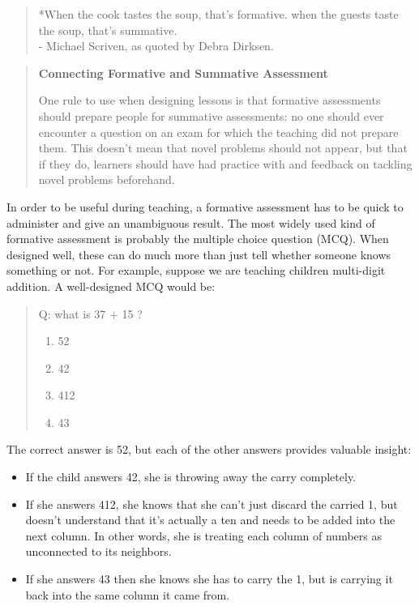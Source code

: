 \documentclass[10pt,statementpaper]{memoir}
\providecommand{\tightlist}{%
  \setlength{\itemsep}{0pt}\setlength{\parskip}{0pt}}
\begin{document}
\begin{quote}
*When the cook tastes the soup, that's formative. when the guests taste
the soup, that's summative.\\
- Michael Scriven, as quoted by Debra Dirksen.
\end{quote}

\begin{quote}
\textbf{Connecting Formative and Summative Assessment}

One rule to use when designing lessons is that formative assessments
should prepare people for summative assessments: no one should ever
encounter a question on an exam for which the teaching did not prepare
them. This doesn't mean that novel problems should not appear, but that
if they do, learners should have had practice with and feedback on
tackling novel problems beforehand.
\end{quote}

In order to be useful during teaching, a formative assessment has to be
quick to administer and give an unambiguous result. The most widely used
kind of formative assessment is probably the multiple choice question
(MCQ). When designed well, these can do much more than just tell whether
someone knows something or not. For example, suppose we are teaching
children multi-digit addition. A well-designed MCQ would be:

\begin{quote}
Q: what is 37 + 15 ?

\begin{enumerate}
\def\labelenumi{\arabic{enumi}.}
\tightlist
\item
  52
\item
  42
\item
  412
\item
  43
\end{enumerate}
\end{quote}

The correct answer is 52, but each of the other answers provides
valuable insight:

\begin{itemize}
\item
  If the child answers 42, she is throwing away the carry completely.
\item
  If she answers 412, she knows that she can't just discard the carried
  1, but doesn't understand that it's actually a ten and needs to be
  added into the next column. In other words, she is treating each
  column of numbers as unconnected to its neighbors.
\item
  If she answers 43 then she knows she has to carry the 1, but is
  carrying it back into the same column it came from.
\end{itemize}
\end{document}
